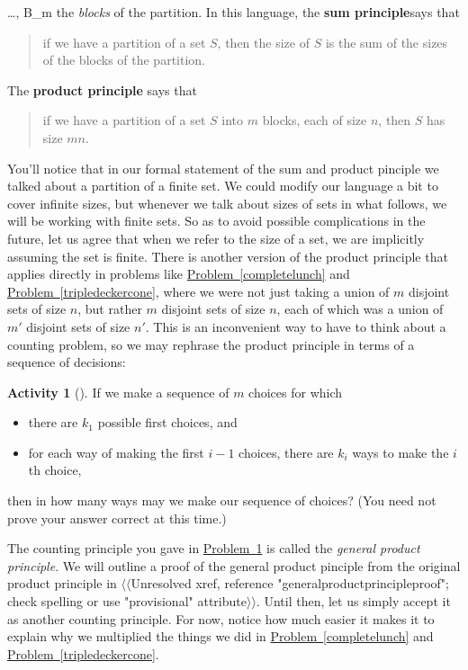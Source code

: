 \documentclass[10pt,]{book}
\newcommand{\terminology}[1]{\textbf{#1}}
\theoremstyle{plain}
\theoremstyle{definition}
\newtheorem{activity}[project]{Activity}
\numberwithin{equation}{chapter}
\begin{document}
\ldots, B_m\) the \emph{blocks} of the partition. In this language, the \terminology{sum principle}says that%
\begin{quote}if we have a partition of a set \(S\), then the size of \(S\) is the sum of the sizes of the blocks of the partition.\end{quote}
The \terminology{product principle} says that%
\begin{quote}if we have a partition of a set \(S\) into \(m\) blocks, each of size \(n\), then \(S\) has size \(mn\).\end{quote}
You'll notice that in our formal statement of the sum and product pinciple we talked about a partition of a finite set. We could modify our language a bit to cover infinite sizes, but whenever we talk about sizes of sets in what follows, we will be working with finite sets. So as to avoid possible complications in the future, let us agree that when we refer to the size of a set, we are implicitly assuming the set is finite. There is another version of the product principle that applies directly in problems like \hyperref[completelunch]{Problem~\ref{completelunch}} and \hyperref[tripledeckercone]{Problem~\ref{tripledeckercone}}, where we were not just taking a union of \(m\) disjoint sets of size \(n\), but rather \(m\) disjoint sets of size \(n\), each of which was a union of \(m'\) disjoint sets of size \(n'\). This is an inconvenient way to have to think about a counting problem, so we may rephrase the product principle in terms of a sequence of decisions:%
\begin{activity}[]\label{generalproductprincipleintro}
If we make a sequence of \(m\) choices for which \leavevmode%
\begin{itemize}[label=\textbullet]
\item{}there are \(k_1\) possible first choices, and%
\item{}for each way of making the first \(i-1\) choices, there are \(k_i\) ways to make the \(i\)th choice,%
\end{itemize}
 then in how many ways may we make our sequence of choices? (You need not prove your answer correct at this time.)%
\end{activity}
The counting principle you gave in \hyperref[generalproductprincipleintro]{Problem~\ref{generalproductprincipleintro}} is called the \emph{general product principle}. We will outline a proof of the general product pinciple from the original product principle in {$\langle\langle$Unresolved xref, reference "generalproductprincipleproof"; check spelling or use "provisional" attribute$\rangle\rangle$}. Until then, let us simply accept it as another counting principle. For now, notice how much easier it makes it to explain why we multiplied the things we did in \hyperref[completelunch]{Problem~\ref{completelunch}} and \hyperref[tripledeckercone]{Problem~\ref{tripledeckercone}}.%
\end{document}
